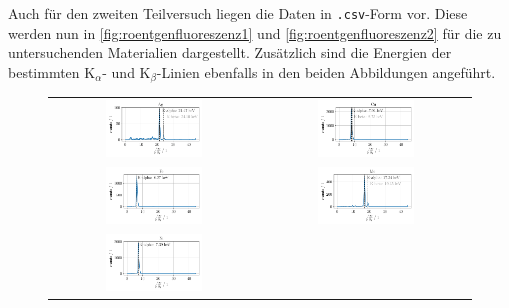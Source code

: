 \documentclass[ngerman]{scrartcl}
\begin{document}
Auch für den zweiten Teilversuch liegen die Daten in \texttt{.csv}-Form vor. Diese werden nun in \autoref{fig:roentgenfluoreszenz1} und \autoref{fig:roentgenfluoreszenz2} für die zu untersuchenden Materialien dargestellt. Zusätzlich sind die Energien der bestimmten K$_{\alpha}$- und K$_{\beta}$-Linien ebenfalls in den beiden Abbildungen angeführt.
%
\begin{figure}[H]
    \centering
    \begin{tabular}{cc}
        \includegraphics[width=0.48\textwidth]{../plots/roentgen_data_1.pdf} &
        \includegraphics[width=0.48\textwidth]{../plots/roentgen_data_2.pdf}   \\
        \includegraphics[width=0.48\textwidth]{../plots/roentgen_data_3.pdf} &
        \includegraphics[width=0.48\textwidth]{../plots/roentgen_data_4.pdf}   \\
        \includegraphics[width=0.48\textwidth]{../plots/roentgen_data_5.pdf} &

\end{tabular}
\end{figure}
\end{document}
